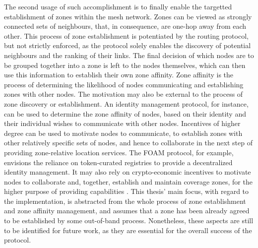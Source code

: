 The second usage of such accomplishment is to finally enable the targetted establishment of zones within the mesh network. Zones can be viewed as strongly connected sets of neighbours, that, in consequence, are one-hop away from each other. This process of zone establishment is potentiated by the routing protocol, but not strictly enforced, as the protocol solely enables the discovery of potential neighbours and the ranking of their links. The final decision of which nodes are to be grouped together into a zone is left to the nodes themselves, which can then use this information to establish their own zone affinity. Zone affinity is the process of determining the likelihood of nodes communicating and establishing zones with other nodes. The motivation may also be external to the process of zone discovery or establishment. An identity management protocol, for instance, can be used to determine the zone affinity of nodes, based on their identity and their individual wishes to communicate with other nodes. Incentives of higher degree can be used to motivate nodes to communicate, to establish zones with other relatively specific sets of nodes, and hence to collaborate in the next step of providing zone-relative location services. The FOAM protocol, for example, envisions the reliance on token-curated registries to provide a decentralized identity management. It may also rely on crypto-economic incentives to motivate nodes to collaborate and, together, establish and maintain coverage zones, for the higher purpose of providing \pol{} capabilities \cite{foam-white-paper}. This thesis' main focus, with regard to the \poc{} implementation, is abstracted from the whole process of zone establishment and zone affinity management, and assumes that a zone has been already agreed to be established by some out-of-band process. Nonetheless, these aspects are still to be identified for future work, as they are essential for the overall success of the protocol.

